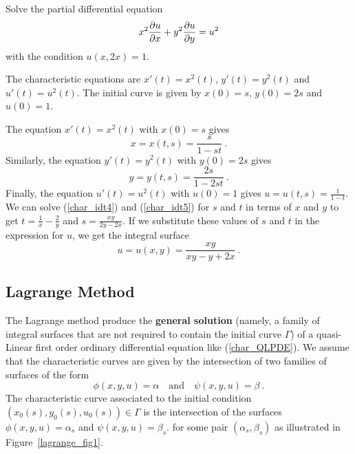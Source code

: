 \begin{egg}
Solve the partial differential equation
\[
x^2 \frac{\partial{u}}{\partial x} + y^2 \frac{\partial{u}}{\partial y} = u^2
\]
with the condition $u(x,2x)=1$.

The characteristic equations are
$\displaystyle x'(t) = x^2(t)$, $\displaystyle y'(t) = y^2(t)$ and
$\displaystyle u'(t) = u^2(t)$.
The initial curve is given by $x(0) = s$, $y(0) = 2s$ and $u(0) = 1$.

The equation $\displaystyle x'(t) = x^2(t)$ with $x(0)=s$ gives
\begin{equation} \label{char_idt4}
x = x(t,s) = \frac{s}{1-st} \ .
\end{equation}
Similarly, the equation $\displaystyle y'(t) = y^2(t)$ with $y(0)=2s$ gives
\begin{equation} \label{char_idt5}
y = y(t,s) = \frac{2s}{1-2st} \ .
\end{equation}
Finally, the equation $\displaystyle u'(t) = u^2(t)$ with $u(0)=1$ gives
$\displaystyle u = u(t,s) = \frac{1}{1-t}$.
We can solve (\ref{char_idt4}) and (\ref{char_idt5}) for $s$ and $t$
in terms of $x$ and $y$ to get
$\displaystyle t = \frac{1}{x} - \frac{2}{y}$ and
$\displaystyle s = \frac{xy}{2y-2x}$.
If we substitute these values of $s$ and $t$ in the
expression for $u$, we get the integral surface
\[
u= u(x,y) = \frac{xy}{xy-y+2x} \ .
\]
\end{egg}

\subsection{Lagrange Method}

The Lagrange method produce the
{\bfseries general solution}%
(namely, a family of integral surfaces that are not required to
contain the initial curve $\Gamma$) of a quasi-Linear first order ordinary
differential equation like (\ref{char_QLPDE}).  We assume that the
characteristic curves are given by the intersection of two families of
surfaces of the form
\[
\phi(x,y,u) = \alpha \quad \text{and} \quad \psi(x,y,u) = \beta \ .
\]
The characteristic curve associated to the initial condition
$(x_0(s),y_0(s),u_0(s)) \in \Gamma$ is the intersection of the
surfaces $\phi(x,y,u) = \alpha_s$ and $\psi(x,y,u) = \beta_s$.
for some pair $(\alpha_s, \beta_s)$ as illustrated in
Figure~\ref{lagrange_fig1}.


